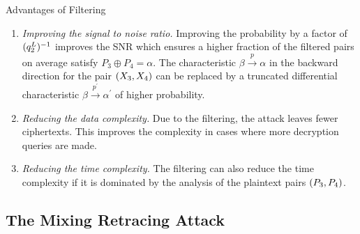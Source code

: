 \documentclass[notheorems]{beamer}
\theoremstyle{definition}
\theoremstyle{example}
\begin{document}
    \begin{frame}[<+->]{Advantages of Filtering}
        \begin{enumerate}
            \item \emph{Improving the signal to noise ratio.} Improving the
            probability by a factor of \((q_2^L)^{-1}\) improves the SNR
            which ensures a higher fraction of the filtered pairs on average
            satisfy \(P_3 \oplus P_4 = \alpha\). The characteristic \(\beta
            \xrightarrow{p} \alpha\) in the backward direction for the pair
            \((X_3, X_4)\) can be replaced by a truncated differential
            characteristic \(\beta \xrightarrow{p^\prime} \alpha^\prime\) of
            higher probability.
            \item \emph{Reducing the data complexity.} Due to the filtering, the
            attack leaves fewer ciphertexts. This improves the complexity in
            cases where more decryption queries are made.
            \item \emph{Reducing the time complexity.} The filtering can also
            reduce the time complexity if it is dominated by the analysis of the
            plaintext pairs \((P_3, P_4)\).
        \end{enumerate}
    \end{frame}

    \subsection{The Mixing Retracing Attack}
    \label{subsec:mix-retr-boomerang}
\end{document}
